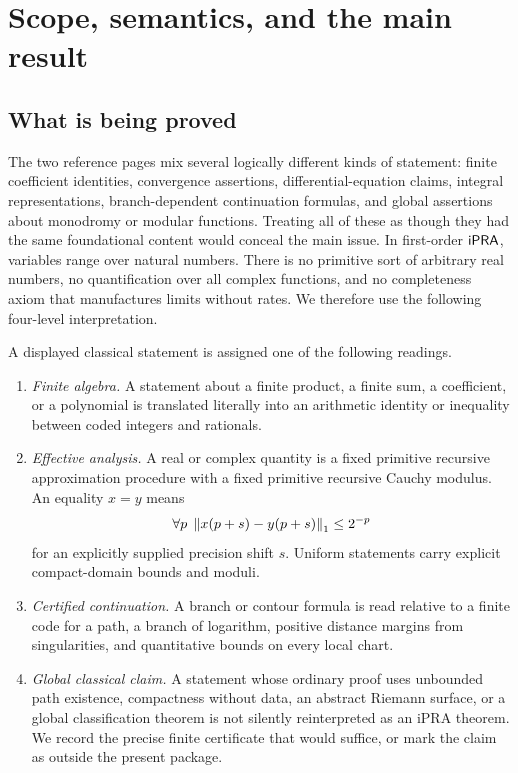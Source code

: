 \section{Scope, semantics, and the main result}\label{sec:scope}

\subsection{What is being proved}

The two reference pages mix several logically different kinds of statement:
finite coefficient identities, convergence assertions, differential-equation
claims, integral representations, branch-dependent continuation formulas,
and global assertions about monodromy or modular functions.  Treating all of
these as though they had the same foundational content would conceal the main
issue.  In first-order \(\mathsf{iPRA}\), variables range over natural numbers.  There
is no primitive sort of arbitrary real numbers, no quantification over all
complex functions, and no completeness axiom that manufactures limits without
rates.  We therefore use the following four-level interpretation.

\begin{definition}\label{def:levels}
A displayed classical statement is assigned one of the following readings.
\begin{enumerate}[label=\textsf{\Alph*.}]
\item \emph{Finite algebra.}  A statement about a finite product, a finite
sum, a coefficient, or a polynomial is translated literally into an
arithmetic identity or inequality between coded integers and rationals.
\item \emph{Effective analysis.}  A real or complex quantity is a fixed
primitive recursive approximation procedure with a fixed primitive recursive
Cauchy modulus.  An equality \(x=y\) means
\[
   \forall p\;\left\lVert x(p+s)-y(p+s)\right\rVert_1\le 2^{-p}
\]
for an explicitly supplied precision shift \(s\).  Uniform statements carry
explicit compact-domain bounds and moduli.
\item \emph{Certified continuation.}  A branch or contour formula is read
relative to a finite code for a path, a branch of logarithm, positive distance
margins from singularities, and quantitative bounds on every local chart.
\item \emph{Global classical claim.}  A statement whose ordinary proof uses
unbounded path existence, compactness without data, an abstract Riemann
surface, or a global classification theorem is not silently reinterpreted as
an iPRA theorem.  We record the precise finite certificate that would suffice,
or mark the claim as outside the present package.
\end{enumerate}
\end{definition}

